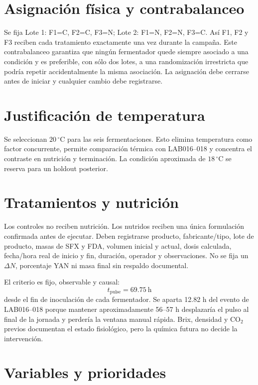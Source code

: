 \documentclass[11pt,a4paper]{article}
\begin{document}
\section{Asignación física y contrabalanceo}

Se fija Lote 1: F1=C, F2=C, F3=N; Lote 2: F1=N, F2=N, F3=C. Así F1, F2 y F3
reciben cada tratamiento exactamente una vez durante la campaña. Este
contrabalanceo garantiza que ningún fermentador quede siempre asociado a una
condición y es preferible, con sólo dos lotes, a una randomización irrestricta
que podría repetir accidentalmente la misma asociación. La asignación debe
cerrarse antes de iniciar y cualquier cambio debe registrarse.

\section{Justificación de temperatura}

Se seleccionan \(20\,^{\circ}\mathrm{C}\) para las seis fermentaciones. Esto
elimina temperatura como factor concurrente, permite comparación térmica con
LAB016--018 y concentra el contraste en nutrición y terminación. La condición
aproximada de \(18\,^{\circ}\mathrm{C}\) se reserva para un holdout posterior.

\section{Tratamientos y nutrición}

Los controles no reciben nutrición. Los nutridos reciben una única formulación
confirmada antes de ejecutar. Deben registrarse producto, fabricante/tipo, lote
de producto, masas de SFX y FDA, volumen inicial y actual, dosis calculada,
fecha/hora real de inicio y fin, duración, operador y observaciones. No se fija
un \(\Delta N\), porcentaje YAN ni masa final sin respaldo documental.

El criterio es fijo, observable y causal:
\[
t_{\mathrm{pulse}}=69.75\ \mathrm{h}
\]
desde el fin de inoculación de cada fermentador. Se aparta 12.82 h del evento
de LAB016--018 porque mantener aproximadamente 56--57 h desplazaría el pulso al
final de la jornada y perdería la ventana manual rápida. Brix, densidad y CO$_2$
previos documentan el estado fisiológico, pero la química futura no decide la
intervención.

\section{Variables y prioridades}
\end{document}
